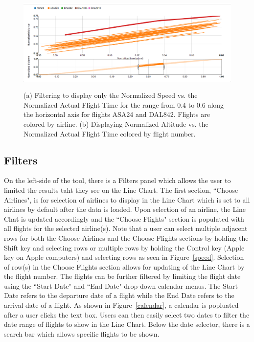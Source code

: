 \documentclass{sig-alternate}
\begin{document}
\begin{figure}
\centering
\includegraphics[width=\textwidth]{figs/outlier.eps}
\caption{}
\label{outlier}
\end{figure}


\begin{figure}
\centering
{}\hfill
{}
\caption{
(a) Filtering to display only the Normalized Speed vs. the Normalized Actual Flight Time for the range from 0.4 to 0.6 along the horizontal axis for flights ASA24 and DAL842. Flights are colored by airline.
(b) Displaying Normalized Altitude vs. the Normalized Actual Flight Time colored by flight number.}
\label{lines}
\end{figure}
 
\subsection{Filters}
\label{subsec-filters}

On the left-side of the tool, there is a Filters panel which allows the user
to limited the results taht they see on the Line Chart. The first section,
``Choose Airlines", is for selection of airlines to display in the 
Line Chart which is set to all airlines by default after the data is loaded.
Upon selection of an airline, the Line Chat is updated accordingly and 
the ``Choose Flights" section is populated with all flights
for the selected airline(s). Note that a user can select
multiple adjacent rows for both the Choose Airlines and the Choose Flights
sections by holding the Shift key and selecting rows or multiple rows
by holding the Control key (Apple key on Apple computers) and selecting rows as 
seen in Figure~\ref{speed}.
Selection of row(s) in the Choose Flights section allows for updating 
of the Line Chart by the flight number. The flights can be further filtered 
by limiting the flight date using the ``Start Date" and ``End Date" drop-down 
calendar menus. The Start Date refers to the departure date of a flight
while the End Date refers to the arrival date of a flight. As shown in
Figure~\ref{calendar}, a calendar is popluated after a user clicks the text box.
Users can then easily select two dates to filter the date range of flights 
to show in the Line Chart. Below the date selector, there is a search bar which 
allows specific flights to be shown.
\end{document}
